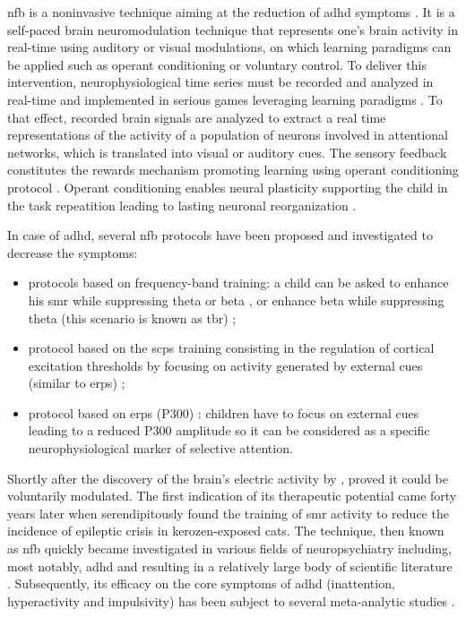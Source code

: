 \gls{nfb} is a noninvasive technique aiming at the reduction of \gls{adhd} symptoms \citep{Arns2015, Steffert2010,
  Marzbani2016}. It is a self-paced brain neuromodulation technique that represents one's brain activity in real-time
using auditory or visual modulations, on which learning paradigms can be applied such as operant conditioning
\citep{Reynolds1975} or voluntary control. To deliver this intervention, neurophysiological time series must be
recorded and analyzed in real-time and implemented in serious games leveraging learning paradigms \citep{Wang2010}. To
that effect, recorded brain signals are analyzed to extract a real time representations of the activity of a population
of neurons involved in attentional networks, which is translated into visual
or auditory cues. The sensory feedback constitutes the rewards mechanism promoting learning using
operant conditioning protocol \citep{Sherlin2011}. Operant conditioning enables neural plasticity supporting the child 
in the task repeatition \citep{Skinner1961} leading to lasting neuronal
reorganization \citep{VanDoren2017}. 

In case of \gls{adhd}, several \gls{nfb} protocols have been proposed and investigated to decrease the symptoms:
\begin{itemize} 
  \item protocols based on frequency-band training: a child can be asked to enhance his \gls{smr} while
    suppressing theta or beta \citep{Lubar1976}, or enhance beta while suppressing theta (this scenario
    is known as \gls{tbr}) \citep{Arns2013}; 
  \item protocol based on the \glspl{scp} training consisting in the
    regulation of cortical excitation thresholds by focusing on activity generated by external cues (similar to
    \glspl{erp}) \citep{Heinrich2004, Banaschewski2007}; 
  \item protocol based on \glspl{erp} (P300)
    \citep{Fouillen2017}: children have to focus on external cues leading to a reduced P300 amplitude so it can be
    considered as a specific neurophysiological marker of selective attention.  
\end{itemize} 

Shortly after the discovery of the brain's electric activity by \citet{Berger1929}, \citet{Durup1935} proved it could
be voluntarily modulated.  The first indication of its therapeutic potential came forty years later when
\citet{Sterman1974} serendipitously found the training of \gls{smr} activity to reduce the incidence of epileptic
crisis in kerozen-exposed cats. The technique, then known as \gls{nfb} quickly became investigated in various fields of
neuropsychiatry including, most notably, \gls{adhd} and resulting in a relatively large body of scientific literature
\citep{Lubar1976, Rossiter1995, Linden1996, Maurizio2014}. Subsequently, its efficacy on the core symptoms of
\gls{adhd} (inattention, hyperactivity and impulsivity) has been subject to several meta-analytic studies
\citep{Loo2005, Lofthouse2012, Arns2009, Micoulaud2014, Sonuga-Barke2013}. 


